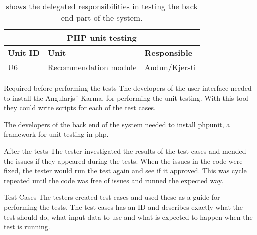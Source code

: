 \begin{table}[!h]
	\begin{center}
		\begin{tabular}{ | l | l | l |}
			\hline
			\multicolumn{3}{|c|}{\textbf{PHP unit testing}} \\
			\hline
			\textbf{Unit ID} & \textbf{Unit} & \textbf{Responsible} \\ \hline
			U6 & Recommendation module & Audun/Kjersti \\ \hline
		\end{tabular}
	\end{center}
	\caption{shows the delegated responsibilities in testing the back end part of the system.}
	\label{Tab_phptesting}
\end{table}

Required before performing the tests\newline
The developers of the user interface needed to install the Angularjs´ Karma, for performing the unit testing. With this tool they could write scripts for each of the test cases.\newline

The developers of the back end of the system needed to install phpunit, a framework for unit testing in php.\newline

After the tests\newline
The tester investigated the results of the test cases and mended the issues if they appeared during the tests. When the issues in the code were fixed, the tester would run the test again and see if it approved. This was cycle repeated until the code was free of issues and runned the expected way.\newline

Test Cases\newline
The testers created test cases and used these as a guide for performing the tests. The test cases has an ID and describes exactly what the test should do, what input data to use and what is expected to happen when the test is running.   

